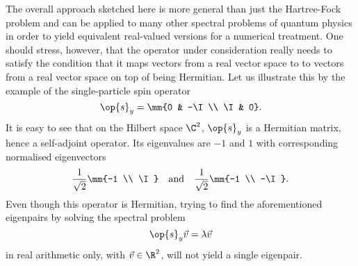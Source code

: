 The overall approach sketched here
is more general than just the Hartree-Fock problem
and can be applied to many other spectral problems of quantum physics
in order to yield equivalent real-valued versions for a numerical treatment.
One should stress, however,
that the operator under consideration really needs to satisfy
the condition that it maps vectors from a real vector space
to to vectors from a real vector space
on top of being Hermitian.
Let us illustrate this by the example of the single-particle spin operator
\[ \op{s}_y = \mm{0 & -\I \\ \I & 0}. \]
It is easy to see that on the Hilbert space $\C^2$,
$\op{s}_y$ is a Hermitian matrix, hence a self-adjoint operator.
Its eigenvalues are $-1$ and $1$ with corresponding normalised eigenvectors
\[ \frac{1}{\sqrt{2}} \mm{-1 \\ \I} \quad \text{and} \quad
  \frac{1}{\sqrt{2}} \mm{-1 \\ -\I}.
\]
Even though this operator is Hermitian,
trying to find the aforementioned eigenpairs by solving the spectral problem
\[ \op{s}_y \vec{v} = \lambda \vec{v} \]
in real arithmetic only, \ie with $\vec{v} \in \R^2$,
will not yield a single eigenpair.
